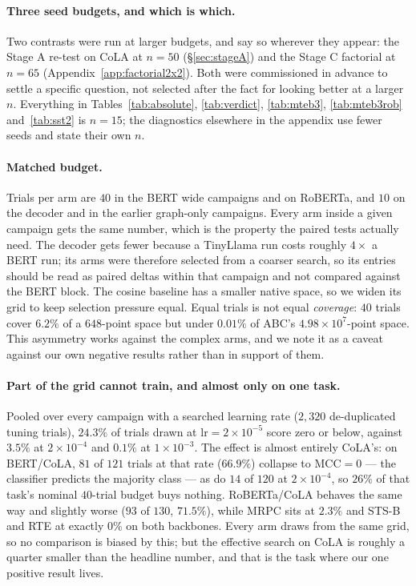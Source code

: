 \documentclass{article}
\begin{document}
\paragraph{Three seed budgets, and which is which.} Two contrasts were run at
larger budgets, and say so wherever they appear: the Stage A re-test on CoLA at
$n=50$ (\S\ref{sec:stageA}) and the Stage C factorial at $n=65$
(Appendix~\ref{app:factorial2x2}). Both were commissioned in advance to settle a
specific question, not selected after the fact for looking better at a larger
$n$. Everything in Tables~\ref{tab:absolute}, \ref{tab:verdict},
\ref{tab:mteb3}, \ref{tab:mteb3rob} and~\ref{tab:sst2} is $n=15$; the
diagnostics elsewhere in the appendix use fewer seeds and state their own $n$.

\paragraph{Matched budget.} Trials per arm are $40$ in the BERT wide campaigns
and on RoBERTa, and $10$ on the decoder and in the earlier graph-only campaigns.
Every arm inside a given campaign gets the same number, which is the property
the paired tests actually need. The decoder gets fewer because a TinyLlama run
costs roughly $4\times$ a BERT run; its arms were therefore selected from a
coarser search, so its entries should be read as paired deltas within that
campaign and not compared against the BERT block. The cosine baseline has a
smaller native space, so we widen its grid to keep selection pressure equal.
Equal trials is not equal \emph{coverage}: $40$ trials cover $6.2\%$ of a
$648$-point space but under $0.01\%$ of ABC's $4.98\times10^{7}$-point space.
This asymmetry works against the complex arms, and we note it as a caveat
against our own negative results rather than in support of them.

\paragraph{Part of the grid cannot train, and almost only on one task.} Pooled
over every campaign with a searched learning rate ($2{,}320$ de-duplicated
tuning trials), $24.3\%$ of trials drawn at $\mathrm{lr}=2\times10^{-5}$ score
zero or below, against $3.5\%$ at $2\times10^{-4}$ and $0.1\%$ at
$1\times10^{-3}$. The effect is almost entirely CoLA's: on BERT/CoLA, $81$ of
$121$ trials at that rate ($66.9\%$) collapse to $\mathrm{MCC}=0$ --- the
classifier predicts the majority class --- as do $14$ of $120$ at
$2\times10^{-4}$, so $26\%$ of that task's nominal $40$-trial budget buys
nothing. RoBERTa/CoLA behaves the same way and slightly worse ($93$ of $130$,
$71.5\%$), while MRPC sits at $2.3\%$ and STS-B and RTE at exactly $0\%$ on both
backbones. Every arm draws from the same grid, so no comparison is biased by
this; but the effective search on CoLA is roughly a quarter smaller than the
headline number, and that is the task where our one positive result lives.
\end{document}
